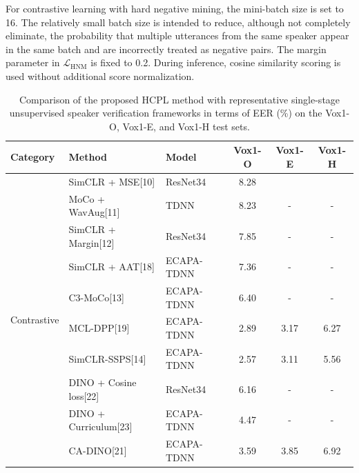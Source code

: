 \documentclass[lettersize,journal]{IEEEtran}
\begin{document}

For contrastive learning with hard negative mining, the mini-batch
size is set to 16. The relatively small batch size is intended to
reduce, although not completely eliminate, the probability that
multiple utterances from the same speaker appear in the same batch
and are incorrectly treated as negative pairs. The margin parameter
in $\mathcal{L}_{\mathrm{HNM}}$ is fixed to 0.2. During inference,
cosine similarity scoring is used without additional score
normalization.
\begin{table}[t] %
    \centering
   \caption{Comparison of the proposed HCPL method with representative single-stage unsupervised speaker verification frameworks in terms of EER (\%) on the Vox1-O, Vox1-E, and Vox1-H test sets.} %
    \setlength{\tabcolsep}{10pt} %
    \begin{tabular}{l l l  c c c} %
        \hline
        Category & Method  & Model   & Vox1-O & Vox1-E & Vox1-H  \\
        \hline
        \multirow{10}{*}{Contrastive}
        &SimCLR + MSE[10] & ResNet34 & 8.28 &  &    \\
        &MoCo + WavAug[11]& TDNN & 8.23 &-  &-    \\
        &SimCLR + Margin[12]& ResNet34 & 7.85 & - &  -  \\
        &SimCLR + AAT[18]& ECAPA-TDNN & 7.36 & - & -   \\
        &C3-MoCo[13]& ECAPA-TDNN & 6.40 &-  & -   \\
        &MCL-DPP[19]& ECAPA-TDNN & 2.89 & 3.17 & 6.27   \\
        &SimCLR-SSPS[14]& ECAPA-TDNN & 2.57 &3.11  & 5.56   \\
        \hline
        \multirow{9}{*}{Self-distillation}
        &DINO + Cosine loss[22]&ResNet34&  6.16 & - & -   \\
        &DINO + Curriculum[23]&ECAPA-TDNN&  4.47 & - & -   \\
        &CA-DINO[21]&ECAPA-TDNN& 3.59 & 3.85 &  6.92  \\

\end{tabular}
\end{table}
\end{document}
